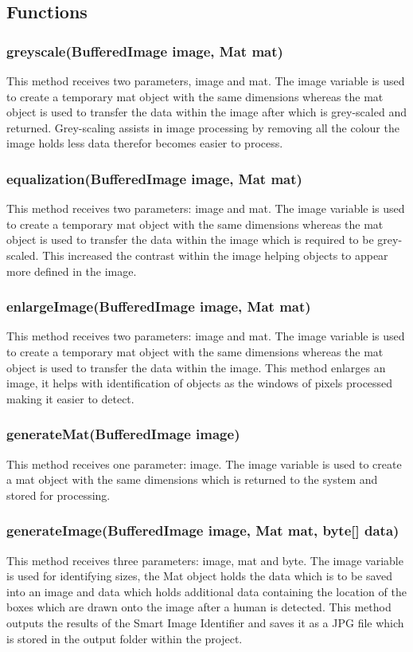 \documentclass[a4paper,12pt]{report}
\begin{document}
\subsection{Functions}
\subsubsection{greyscale(BufferedImage image, Mat mat)}
This method receives two parameters, image and mat. The image variable is used to
create a temporary mat object with the same dimensions whereas the mat object is used
to transfer the data within the image after which is grey-scaled and returned.
Grey-scaling assists in image processing by removing all the colour the image holds less
data therefor becomes easier to process.
\subsubsection{equalization(BufferedImage image, Mat mat)}
This method receives two parameters: image and mat. The image variable is used to
create a temporary mat object with the same dimensions whereas the mat object is used
to transfer the data within the image which is required to be grey-scaled.
This increased the contrast within the image helping objects to appear more defined in
the image.
\subsubsection{enlargeImage(BufferedImage image, Mat mat)}
This method receives two parameters: image and mat. The image variable is used to
create a temporary mat object with the same dimensions whereas the mat object is used
to transfer the data within the image.
This method enlarges an image, it helps with identification of objects as the windows of
pixels processed making it easier to detect.
\subsubsection{generateMat(BufferedImage image)}
This method receives one parameter: image. The image variable is used to create a mat
object with the same dimensions which is returned to the system and stored for
processing.
\subsubsection{generateImage(BufferedImage image, Mat mat, byte[] data)}
This method receives three parameters: image, mat and byte. The image variable is used
for identifying sizes, the Mat object holds the data which is to be saved into an image and
data which holds additional data containing the location of the boxes which are drawn
onto the image after a human is detected.
This method outputs the results of the Smart Image Identifier and saves it as a JPG file
which is stored in the output folder within the project.
\end{document}
